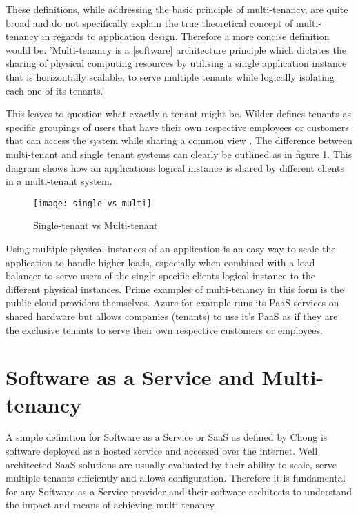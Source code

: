 These definitions, while addressing the basic principle of multi-tenancy,  are quite broad and do not specifically explain the true theoretical concept of multi-tenancy in regards to application design. Therefore a more concise definition would be: 'Multi-tenancy is a [software] architecture principle which dictates the sharing of physical computing resources by utilising a single application instance that is horizontally scalable, to serve multiple tenants while logically isolating each one of its tenants.'

This leaves to question what exactly a tenant might be. Wilder defines tenants as specific groupings of users that have their own respective employees or customers that can access the system while sharing a common view \cite{Wilder2012-so}. The difference between multi-tenant and single tenant systems can clearly be outlined as in figure \ref{fig:single_vs_multi}. This diagram shows how an applications logical instance is shared by different clients in a multi-tenant system.


\begin{figure}
\centering
\texttt{[image: single\_vs\_multi]}
\caption{Single-tenant vs Multi-tenant}
\label{fig:single_vs_multi}
\end{figure}

Using multiple physical instances of an application is an easy way to scale the application to handle higher loads, especially when combined with a load balancer to serve users of the single specific clients logical instance to the different physical instances. Prime examples of multi-tenancy in this form is the public cloud providers themselves. Azure for example runs its PaaS services on shared hardware but allows companies (tenants) to use it's PaaS as if they are the exclusive tenants to serve their own respective customers or employees. 

\section{Software as a Service and Multi-tenancy}
A simple definition for Software as a Service or SaaS as defined by Chong \cite{Chong2006} is software deployed as a hosted service and accessed over the internet. Well architected SaaS solutions are usually evaluated by their ability to scale, serve multiple-tenants efficiently and allows configuration. Therefore it is fundamental for any Software as a Service provider and their software architects to understand the impact and means of achieving multi-tenancy.


